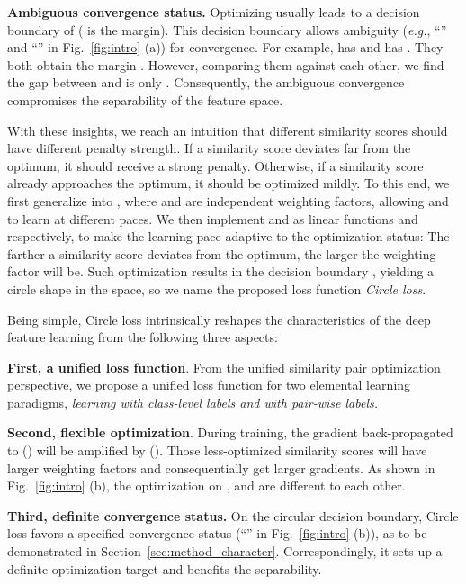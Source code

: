 \documentclass[10pt,twocolumn,letterpaper]{article}
\begin{document}
 \textbf{Ambiguous convergence status.}
Optimizing  usually leads to a decision boundary of  ( is the margin). This decision boundary allows ambiguity (\emph{e.g.}, ``'' and ``'' in Fig.~\ref{fig:intro} (a)) for convergence. For example,  has  and  has . They both obtain the margin . However, comparing them against each other, we find the gap between  and  is only . Consequently, the ambiguous convergence compromises the separability of the feature space. 


With these insights, we reach an intuition that different similarity scores should have different penalty strength. If a similarity score deviates far from the optimum, it should receive a strong penalty. Otherwise, if a similarity score already approaches the optimum, it should be optimized mildly. To this end, we first generalize  into , where  and  are independent weighting factors, allowing  and  to learn at different paces. 
We then implement  and  as linear functions \wrt  and  respectively, to make the learning pace adaptive to the optimization status: The farther a similarity score deviates from the optimum, the larger the weighting factor will be. Such optimization results in the decision boundary , yielding a circle shape in the  space, so we name the proposed loss function \emph{Circle loss}.

Being simple, Circle loss intrinsically reshapes the characteristics of the deep feature learning from the following three aspects:

\textbf{First, a unified loss function}. From the unified similarity pair optimization perspective, we propose a unified loss function for two elemental learning paradigms, \emph{learning with class-level labels and with pair-wise labels.}

\textbf{Second, flexible optimization}. During training, the gradient back-propagated to  () will be amplified by  (). Those less-optimized similarity scores will have larger weighting factors and consequentially get larger gradients. As shown in Fig.~\ref{fig:intro} (b), the optimization on ,  and  are different to each other.



\textbf{Third, definite convergence status.} On the circular decision boundary, Circle loss favors a specified convergence status (``'' in Fig.~\ref{fig:intro} (b)), as to be demonstrated in Section~\ref{sec:method_character}. Correspondingly, it sets up a definite optimization target and benefits the separability. 
\end{document}
